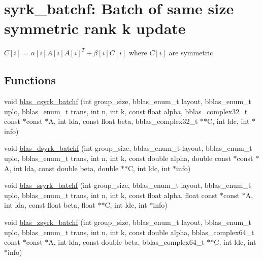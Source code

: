 \hypertarget{group__syrk__batchf}{}\section{syrk\+\_\+batchf\+: Batch of same size symmetric rank k update}
\label{group__syrk__batchf}


$ C[i] = \alpha[i] A[i] A[i]^T + \beta[i] C[i] $ where $ C[i] $ are symmetric  


\subsection*{Functions}
\begin{DoxyCompactItemize}
\item 
void \hyperlink{group__syrk__batchf_ga6e2506a96937903c6622ec97d077b57d}{blas\+\_\+csyrk\+\_\+batchf} (int group\+\_\+size, bblas\+\_\+enum\+\_\+t layout, bblas\+\_\+enum\+\_\+t uplo, bblas\+\_\+enum\+\_\+t trans, int n, int k, const float alpha, bblas\+\_\+complex32\+\_\+t const $\ast$const $\ast$A, int lda, const float beta, bblas\+\_\+complex32\+\_\+t $\ast$$\ast$C, int ldc, int $\ast$info)
\item 
void \hyperlink{group__syrk__batchf_gaf7aebb3698636b020b8c6b5a09715011}{blas\+\_\+dsyrk\+\_\+batchf} (int group\+\_\+size, bblas\+\_\+enum\+\_\+t layout, bblas\+\_\+enum\+\_\+t uplo, bblas\+\_\+enum\+\_\+t trans, int n, int k, const double alpha, double const $\ast$const $\ast$A, int lda, const double beta, double $\ast$$\ast$C, int ldc, int $\ast$info)
\item 
void \hyperlink{group__syrk__batchf_ga1406866a70d2f1b721b114c517f503dd}{blas\+\_\+ssyrk\+\_\+batchf} (int group\+\_\+size, bblas\+\_\+enum\+\_\+t layout, bblas\+\_\+enum\+\_\+t uplo, bblas\+\_\+enum\+\_\+t trans, int n, int k, const float alpha, float const $\ast$const $\ast$A, int lda, const float beta, float $\ast$$\ast$C, int ldc, int $\ast$info)
\item 
void \hyperlink{group__syrk__batchf_ga7f8f08570898ef886153af70eafe7675}{blas\+\_\+zsyrk\+\_\+batchf} (int group\+\_\+size, bblas\+\_\+enum\+\_\+t layout, bblas\+\_\+enum\+\_\+t uplo, bblas\+\_\+enum\+\_\+t trans, int n, int k, const double alpha, bblas\+\_\+complex64\+\_\+t const $\ast$const $\ast$A, int lda, const double beta, bblas\+\_\+complex64\+\_\+t $\ast$$\ast$C, int ldc, int $\ast$info)
\end{DoxyCompactItemize}


